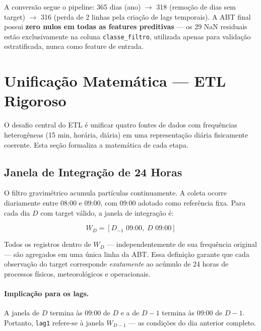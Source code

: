 \documentclass[12pt, a4paper]{article}
\newcommand{\feature}[1]{\texttt{#1}}
\newcommand{\abt}{ABT}
\begin{document}
A conversão segue o pipeline: 365 dias (ano) $\to$ 318 (remoção de dias sem
target) $\to$ 316 (perda de 2 linhas pela criação de lags temporais). A
\abt{} final possui \textbf{zero nulos em todas as features preditivas} —
os 29 NaN residuais estão exclusivamente na coluna \feature{classe\_filtro},
utilizada apenas para validação estratificada, nunca como feature de entrada.

\newpage
\section{Unificação Matemática — ETL Rigoroso}
\label{sec:math}

O desafio central do ETL é unificar quatro fontes de dados com frequências
heterogêneas (15 min, horária, diária) em uma representação diária
fisicamente coerente. Esta seção formaliza a matemática de cada etapa.

\subsection{Janela de Integração de 24 Horas}
\label{subsec:janela}

O filtro gravimétrico acumula partículas continuamente. A coleta ocorre
diariamente entre 08:00 e 09:00, com 09:00 adotado como referência fixa.
Para cada dia $D$ com target válido, a janela de integração é:

\begin{equation}
    \boxed{W_D = \left[D_{-1} \text{ 09:00},\; D \text{ 09:00}\right]}
    \label{eq:janela}
\end{equation}

Todos os registros dentro de $W_D$ — independentemente de sua frequência
original — são agregados em uma única linha da \abt{}. Essa definição
garante que cada observação do target corresponde \textit{exatamente} ao
acúmulo de 24 horas de processos físicos, meteorológicos e operacionais.

\paragraph{Implicação para os lags.} A janela de $D$ termina às 09:00 de
$D$ e a de $D-1$ termina às 09:00 de $D-1$. Portanto, \feature{lag1}
refere-se à janela $W_{D-1}$ — as condições do dia anterior completo.
\end{document}
